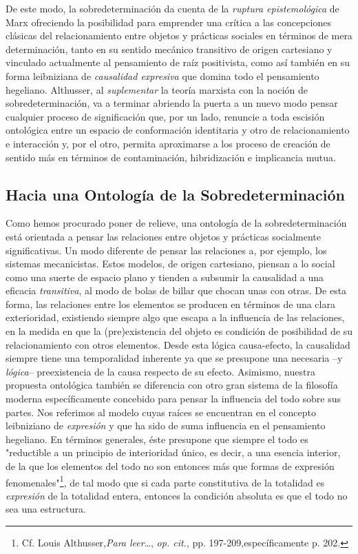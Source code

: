 \documentclass{book}
\begin{document}
De este modo, la sobredeterminación da cuenta de la \emph{ruptura
epistemológica} de Marx ofreciendo la posibilidad para emprender una
crítica a las concepciones clásicas del relacionamiento entre objetos y
prácticas sociales en términos de mera determinación, tanto en su
sentido mecánico transitivo de origen cartesiano y vinculado actualmente
al pensamiento de raíz positivista, como así también en su forma
leibniziana de \emph{causalidad expresiva} que domina todo el
pensamiento hegeliano. Althusser, al \emph{suplementar} la teoría
marxista con la noción de sobredeterminación, va a terminar abriendo la
puerta a un nuevo modo pensar cualquier proceso de significación que,
por un lado, renuncie a toda escisión ontológica entre un espacio de
conformación identitaria y otro de relacionamiento e interacción y, por
el otro, permita aproximarse a los proceso de creación de sentido más en
términos de contaminación, hibridización e implicancia mutua.

\hypertarget{hacia-una-ontologuxeda-de-la-sobredeterminaciuxf3n}{%
\subsection{Hacia una Ontología de la Sobredeterminación}\label{hacia-una-ontologuxeda-de-la-sobredeterminaciuxf3n}}

Como hemos procurado poner de relieve, una ontología de la
sobredeterminación está orientada a pensar las relaciones entre objetos
y prácticas socialmente significativas. Un modo diferente de pensar las
relaciones a, por ejemplo, los sistemas mecanicistas. Estos modelos, de
origen cartesiano, piensan a lo social como una suerte de espacio plano
y tienden a subsumir la causalidad a una eficacia \emph{transitiva}, al
modo de bolas de billar que chocan unas con otras. De esta forma, las
relaciones entre los elementos se producen en términos de una clara
exterioridad, existiendo siempre algo que escapa a la influencia de las
relaciones, en la medida en que la (pre)existencia del objeto es
condición de posibilidad de su relacionamiento con otros elementos.
Desde esta lógica causa-efecto, la causalidad siempre tiene una
temporalidad inherente ya que se presupone una necesaria --y
\emph{lógica}-- preexistencia de la causa respecto de su efecto.
Asimismo, nuestra propuesta ontológica también se diferencia con otro
gran sistema de la filosofía moderna específicamente concebido para
pensar la influencia del todo sobre sus partes. Nos referimos al modelo
cuyas raíces se encuentran en el concepto leibniziano de
\emph{expresión} y que ha sido de suma influencia en el pensamiento
hegeliano. En términos generales, éste presupone que siempre el todo es
"reductible a un principio de interioridad único, es decir, a una
esencia interior, de la que los elementos del todo no son entonces más
que formas de expresión fenomenales"\footnote{Cf. Louis
  Althusser,\emph{Para leer}\ldots, \emph{op. cit.}, pp.
  197-209,específicamente p. 202.}, de tal modo que si cada parte
constitutiva de la totalidad es \emph{expresión} de la totalidad entera,
entonces la condición absoluta es que el todo no sea una estructura.
\end{document}
